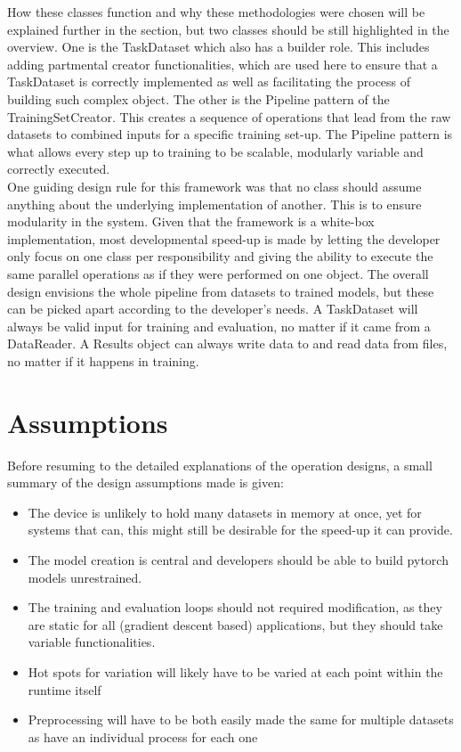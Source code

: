 How these classes function and why these methodologies were chosen will be explained further in the section, but two classes should be still highlighted in the overview. One is the TaskDataset which also has a builder role. This includes adding partmental creator functionalities, which are used here to ensure that a TaskDataset is correctly implemented as well as facilitating the process of building such complex object. The other is the Pipeline pattern of the TrainingSetCreator. This creates a sequence of operations that lead from the raw datasets to combined inputs for a specific training set-up. The Pipeline pattern is what allows every step up to training to be scalable, modularly variable and correctly executed. \\

One guiding design rule for this framework was that no class should assume anything about the underlying implementation of another. This is to ensure modularity in the system. Given that the framework is a white-box implementation, most developmental speed-up is made by letting the developer only focus on one class per responsibility and giving the ability to execute the same parallel operations as if they were performed on one object. The overall design envisions the whole pipeline from datasets to trained models, but these can be picked apart according to the developer's needs. A TaskDataset will always be valid input for training and evaluation, no matter if it came from a DataReader. A Results object can always write data to and read data from files, no matter if it happens in training. \\


\section{Assumptions} \label{Design:Assumptions}

Before resuming to the detailed explanations of the operation designs, a small summary of the design assumptions made is given:

\begin{itemize}
	\item The device is unlikely to hold many datasets in memory at once, yet for systems that can, this might still be desirable for the speed-up it can provide. 
	\item The model creation is central and developers should be able to build pytorch models unrestrained. 
	\item The training and evaluation loops should not required modification, as they are static for all (gradient descent based) applications, but they should take variable functionalities.
	\item Hot spots for variation will likely have to be varied at each point within the runtime itself
	\item Preprocessing will have to be both easily made the same for multiple datasets as have an individual process for each one
\end{itemize}


